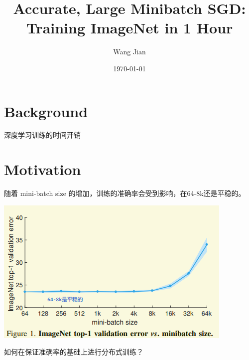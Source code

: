 \documentclass[11pt]{article}
\author{Wang Jian}
\date{\today}
\title{Accurate, Large Minibatch SGD: Training ImageNet in 1 Hour}
\begin{document}
\maketitle
\tableofcontents

\section{Background}
\label{sec:org2400106}
深度学习训练的时间开销
\section{Motivation}
\label{sec:org08a4e72}
随着 mini-batch size 的增加，训练的准确率会受到影响，在64-8k还是平稳的。
\begin{center}
\includegraphics[width=.9\linewidth]{Accurate_Large_Minibatch_SGD.org_imgs/20201114_181812_yX0kcP.png}
\end{center}

如何在保证准确率的基础上进行分布式训练？
\end{document}
